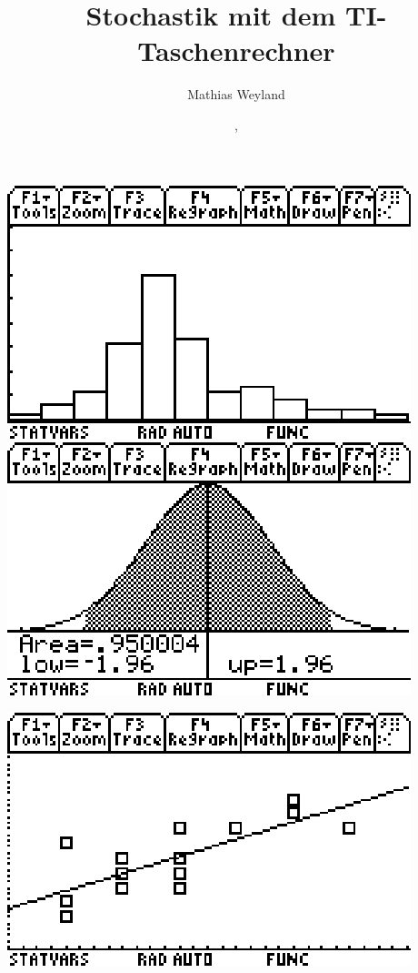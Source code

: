 \documentclass[a4paper,11pt,notitlepage,halfparskip,headsepline,normalheadings,twoside]{scrartcl}
\title{Stochastik mit dem TI-Taschenrechner}
\date{\GITHash , \VCDateISO}
\author{Mathias Weyland}
\begin{document}
\maketitle

\begin{center}
\begin{multicols}{2}
\includegraphics{eps/titlepage1}
\columnbreak
\includegraphics{eps/titlepage2}
\end{multicols}
\includegraphics{eps/titlepage3}
\end{center}
\newpage
\end{document}

